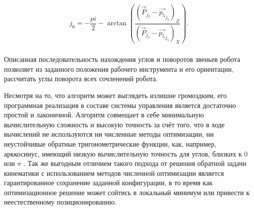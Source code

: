 \begin{gather*}
    j_6 = -\dfrac{pi}{2} - \arctan \left( \dfrac
    {\left( \overrightarrow{P}_{j_5} - \overrightarrow{p_5}_{j_5} \right)_Z}
    {\left( \overrightarrow{P}_{j_5} - \overrightarrow{p_5}_{j_5} \right)_X} \right).
\end{gather*} \\

Описанная последовательность нахождения углов и поворотов звеньев робота позволяет из заданного положения рабочего инструмента и его ориентации, рассчитать углы поворота всех сочленений робота.

Несмотря на то, что алгоритм может выглядеть излишне громоздким, его программная реализация в составе системы управления является достаточно простой и лаконичной.
Алгоритм совмещает в себе минимальную вычислительную сложность и высокую точность за счёт того, что в ходе вычислений не используются ни численные методы оптимизации, ни неустойчивые обратные тригонометрические функции, как, например, арккосинус, имеющий низкую вычислительную точность для углов, близких к $0$ или $\pi$ \cite{bib:Fu_1987}.
Так же выгодным отличием такого подхода от решения обратной задачи кинематики с использованием методов численной оптимизации является гарантированное сохранение заданной конфигурации, в то время как оптимизационное решение может сойтись в локальный минимум или привести к неестественному позиционированию.
